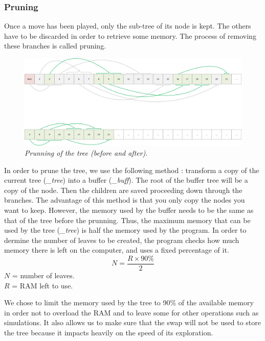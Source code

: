 \subsubsection{Pruning}
Once a move has been played, only the sub-tree of its node is kept. The others have to be discarded in order to retrieve some memory. The process of removing these branches is called pruning.
\begin{figure}[H] 
\centerline{\includegraphics[width=\textwidth]{Data_Structure/Img/array.png}}
\caption{\label{fig:arrayprunning}\textit{Prunning of the tree (before and after)}.}
\end{figure}
In order to prune the tree, we use the following method : transform a copy of the current tree (\textit{\_tree}) into a buffer (\textit{\_buff}). The root of the buffer tree will be a copy of the node. Then the children are saved proceeding down through the branches. The advantage of this method is that you only copy the nodes you want to keep. However, the memory used by the buffer needs to be the same as that of the tree before the prunning. Thus, the maximum memory that can be used by the tree (\textit{\_tree}) is half the memory used by the program. In order to dermine the number of leaves to be created, the program checks how much memory there is left on the computer, and uses a fixed percentage of it.
\begin{equation}
N = \frac{R \times 90\%}{2}
\end{equation}
\ensuremath{N} = number of leaves.\\
\ensuremath{R} = RAM left to use.

We chose to limit the memory used by the tree to 90\% of the available memory in order not to overload the RAM and to leave some for other operations such as simulations. It also allows us to make sure that the swap will not be used to store the tree because it impacts heavily on the speed of its exploration.

